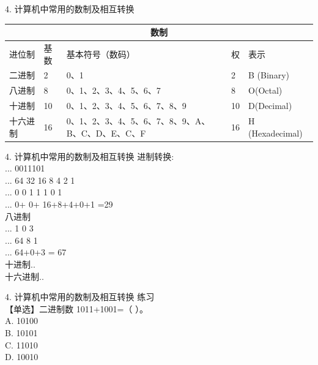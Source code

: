 \documentclass[aspectratio=169]{beamer}
\begin{document}
\begin{frame}[t]{4. 计算机中常用的数制及相互转换} \vspace{20pt}

    \begin{tabular}{ |p{2cm}|p{1cm}|p{5cm}|p{1cm}|p{3cm}|  }
        \hline
        \multicolumn{5}{|c|}{数制} \\
        \hline
        进位制  & 基数 & 基本符号（数码）& 权 & 表示\\
        \hline
        二进制  & 2    &     0、1 &                                               2  & B (Binary)\\
        八进制  & 8    &     0、1、2、3、4、5、6、7 &                             8  & O(Octal)\\
        十进制  & 10   &     0、1、2、3、4、5、6、7、8、9 &                       10 & D(Decimal)\\
        十六进制& 16   &     0、1、2、3、4、5、6、7、8、9、A、B、C、D、E、C、F &  16 & H (Hexadecimal)\\
        \hline
    \end{tabular}
\end{frame}


\begin{frame}[t]{4. 计算机中常用的数制及相互转换} \vspace{20pt}
    进制转换:\\
... 0011101\\
... 64 32 16 8 4 2 1 \\
... 0  0  1  1 1 0 1\\
... 0+ 0+ 16+8+4+0+1 =29 \\

八进制  \\
... 1  0  3\\
... 64 8 1 \\
... 64+0+3 = 67 \\

十进制..  \\
十六进制..\\

\end{frame}



\begin{frame}[t]{4. 计算机中常用的数制及相互转换} \vspace{20pt}
    练习\\
    【单选】二进制数 1011+1001=（ ）。\\
A. 10100\\ B. 10101\\
C. 11010\\ D. 10010\\
\end{frame}
\end{document}

